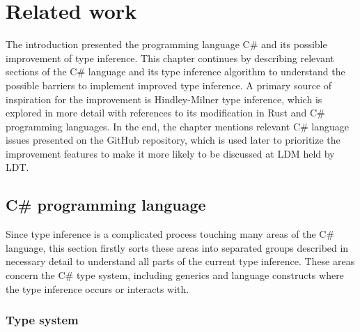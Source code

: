 \chapter{Related work}

The introduction presented the programming language C\# and its possible improvement of type inference. 
This chapter continues by describing relevant sections of the C\# language and its type inference algorithm to understand the possible barriers to implement improved type inference. 
A primary source of inspiration for the improvement is Hindley-Milner type inference, which is explored in more detail with references to its modification in Rust and C\# programming languages.
In the end, the chapter mentions relevant C\# language issues presented on the GitHub repository, which is used later to prioritize the improvement features to make it more likely to be discussed at \ac{LDM} held by \ac{LDT}. 

\section{C\# programming language}

Since type inference is a complicated process touching many areas of the C\# language, this section firstly sorts these areas into separated groups described in necessary detail to understand all parts of the current type inference. 
These areas concern the C\# type system, including generics and language constructs where the type inference occurs or interacts with.

\subsection{Type system}

